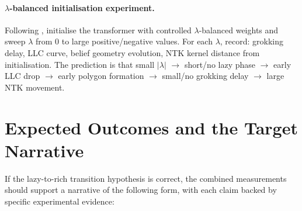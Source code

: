\documentclass[11pt,a4paper]{article}
\begin{document}
\paragraph{$\lambda$-balanced initialisation experiment.} Following \citet{domine2025lazy}, initialise the transformer with controlled $\lambda$-balanced weights and sweep $\lambda$ from 0 to large positive/negative values. For each $\lambda$, record: grokking delay, LLC curve, belief geometry evolution, NTK kernel distance from initialisation. The prediction is that small $|\lambda|$ $\to$ short/no lazy phase $\to$ early LLC drop $\to$ early polygon formation $\to$ small/no grokking delay $\to$ large NTK movement.

\section{Expected Outcomes and the Target Narrative}

If the lazy-to-rich transition hypothesis is correct, the combined measurements should support a narrative of the following form, with each claim backed by specific experimental evidence:
\end{document}
